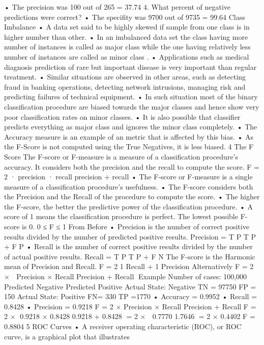 \documentclass[a4paper,12pt]{article}
\begin{document}
• The precision was 100 out of 265 = 37.74%
4. What percent of negative predictions were correct?
• The specifity was 9700 out of 9735 = 99.64%
Class Imbalance
• A data set said to be highly skewed if sample from one class is in higher number than other.
• In an imbalanced data set the class having more number of instances is called as major class
while the one having relatively less number of instances are called as minor class .
• Applications such as medical diagnosis prediction of rare but important disease is very important
than regular treatment.
• Similar situations are observed in other areas, such as detecting fraud in banking operations,
detecting network intrusions, managing risk and predicting failures of technical equipment.
• In such situation most of the binary classification procedure are biased towards the major
classes and hence show very poor classification rates on minor classes.
• It is also possible that classifier predicts everything as major class and ignores the minor class
completely.
• The Accuracy measure is an example of an metric that is affected by this bias.
• As the F-Score is not computed using the True Negatives, it is less biased.
4
The F Score
The F-score or F-measure is a measure of a classification procedure’s accuracy. It considers both
the precision and the recall to compute the score.
F = 2 ·
precision · recall
precision + recall
• The F-score or F-measure is a single measure of a classification procedure’s usefulness.
• The F-score considers both the Precision and the Recall of the procedure to compute the
score.
• The higher the F-score, the better the predictive power of the classification procedure.
• A score of 1 means the classification procedure is perfect. The lowest possible F-score is 0.
0 ≤ F ≤ 1
From Before
• Precision is the number of correct positive results divided by the number of predicted
positive results.
Precision = T P
T P + F P
• Recall is the number of correct positive results divided by the number of actual positive
results.
Recall = T P
T P + F N
The F-score is the Harmonic mean of Precision and Recall.
F =
2
1
Recall +
1
Precision
Alternatively
F = 2 ×

Precision × Recall
Precision + Recall
Example
Number of cases: 100,000
Predicted Negative Predicted Positive
Actual State: Negative TN = 97750 FP = 150
Actual State: Positive FN= 330 TP =1770
• Accuracy = 0.9952
• Recall = 0.8428
• Precision = 0.9218
F = 2 ×
Precision × Recall
Precision + Recall
F = 2 ×

0.9218 × 0.8428
0.9218 + 0.8428
= 2 ×

0.7770
1.7646
= 2 × 0.4402
F = 0.8804
5
ROC Curves
• A receiver operating characteristic (ROC), or ROC curve, is a graphical plot that illustrates
\end{document}
